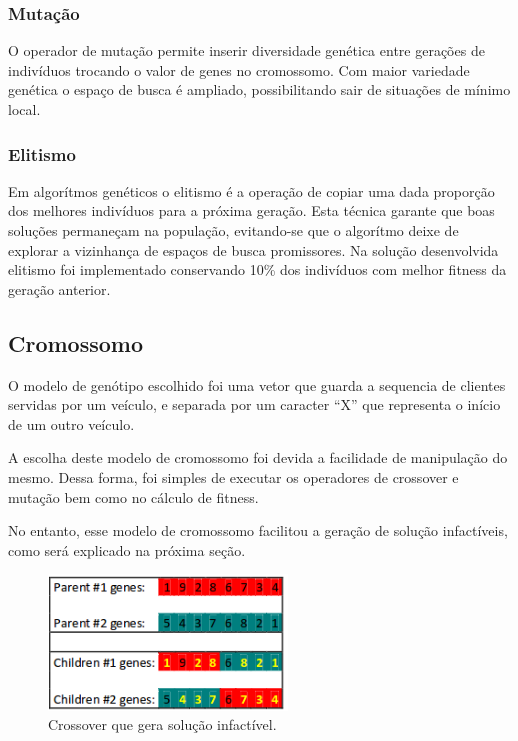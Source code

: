 \documentclass[conference]{IEEEtran}
\begin{document}
\subsubsection{Mutação}
O operador de mutação permite inserir diversidade genética entre gerações de indivíduos trocando o valor de genes no cromossomo. Com maior variedade genética o espaço de busca é ampliado, possibilitando sair de situações de mínimo local.

\subsubsection{Elitismo}
Em algorítmos genéticos o elitismo é a operação de copiar uma dada proporção dos melhores indivíduos para a próxima geração. Esta técnica garante que boas soluções permaneçam na população, evitando-se que o algorítmo deixe de explorar a vizinhança de espaços de busca promissores. Na solução desenvolvida elitismo foi implementado conservando 10\% dos indivíduos com melhor fitness da geração anterior.



\subsection{Cromossomo}
O modelo de genótipo escolhido foi uma vetor que guarda a sequencia de clientes servidas por um veículo, e separada por um caracter ``X'' que representa o início de um outro veículo.

A escolha deste modelo de cromossomo foi devida a facilidade de manipulação do mesmo. Dessa forma, foi simples de executar os operadores de crossover e mutação bem como no cálculo de fitness.

No entanto, esse modelo de cromossomo facilitou a geração de solução infactíveis, como será explicado na próxima seção.

\begin{figure}[!t]
\centering
\includegraphics[width=2.5in]{error_in_crossover}
\caption{Crossover que gera solução infactível.}
\label{fig_sim}
\end{figure}
\end{document}
